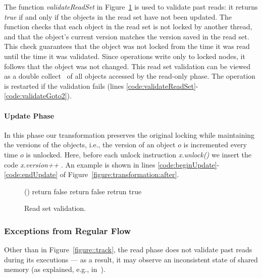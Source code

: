 The function \emph{validateReadSet} in Figure~\ref{figure::validate} is used to validate past reads: it returns \emph{true} if and only if the objects in the read set have not been updated.
%
The function checks that each object in the read set is not locked by another thread,
and that the object's current version matches the version saved in the
read set.
This check guarantees that the object was not locked from the time it was read until
the time it was validated.
Since operations write only to
locked nodes, it follows that the object was not changed.
This read set validation can be viewed as a double collect~\cite{Afek:1993:ASS:153724.153741}
of all objects accessed by the read-only phase.
%
The operation is restarted if the validation fails (lines \ref{code:validateReadSet}-\ref{code:validateGoto2}).

\paragraph{Update Phase}
In this phase our transformation preserves the original locking while maintaining the versions of the objects, i.e., the version of an object $o$ is incremented every time $o$ is unlocked.
Here, before each unlock instruction \emph{\ttfamily x.unlock()} we insert the code \emph{\ttfamily x.version++} .
An example is shown in lines \ref{code:beginUpdate}-\ref{code:endUpdate} of Figure~\ref{figure:transformation:after}.

\begin{figure}
\codesize
\begin{algorithmic}[1]{}
		{\ttfamily
		()
			\State return false 
			\EndIf
				\State return false 
			\EndIf
		\EndFor
		\State retrun true 
		\EndFunction
		}
\end{algorithmic}
\caption{Read set validation.\label{figure::validate}}
\end{figure}



\subsubsection{Exceptions from Regular Flow}
\label{sssec:alg-abnormal}


Other than in Figure~\ref{figure::track}, the read phase does not validate past reads during its executions ---
as a result, it may observe an inconsistent state of shared memory (as explained, e.g., in~\cite{HLR:SLCA2010}).
%


